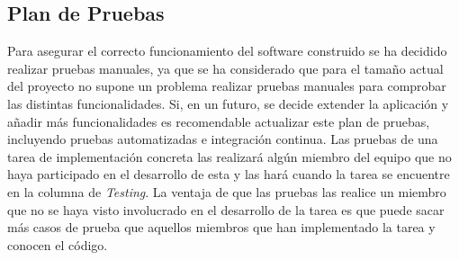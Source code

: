 \subsection{Plan de Pruebas}\label{sec:qapruebas}
Para asegurar el correcto funcionamiento del software construido se ha decidido realizar pruebas manuales, ya que se ha considerado que para el tamaño actual del proyecto no supone un problema realizar pruebas manuales para comprobar las distintas funcionalidades. Si, en un futuro, se decide extender la aplicación y añadir más funcionalidades es recomendable actualizar este plan de pruebas, incluyendo pruebas automatizadas e integración continua. Las pruebas de una tarea de implementación concreta las realizará algún miembro del equipo que no haya participado en el desarrollo de esta y las hará cuando la tarea se encuentre en la columna de \textit{Testing}. La ventaja de que las pruebas las realice un miembro que no se haya visto involucrado en el desarrollo de la tarea es que puede sacar más casos de prueba que aquellos miembros que han implementado la tarea y conocen el código.

